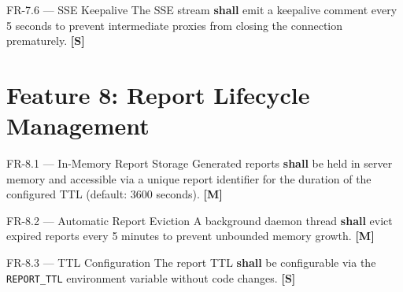 \begin{reqbox}{FR-7.6 — SSE Keepalive}
  The SSE stream \textbf{shall} emit a keepalive comment every 5 seconds to
  prevent intermediate proxies from closing the connection prematurely.
  \hfill \textbf{[S]}
\end{reqbox}

\section{Feature 8: Report Lifecycle Management}
\label{sec:fr_lifecycle}

\begin{reqbox}{FR-8.1 — In-Memory Report Storage}
  Generated reports \textbf{shall} be held in server memory and accessible via a
  unique report identifier for the duration of the configured TTL (default:
  3600 seconds). \hfill \textbf{[M]}
\end{reqbox}

\begin{reqbox}{FR-8.2 — Automatic Report Eviction}
  A background daemon thread \textbf{shall} evict expired reports every 5 minutes
  to prevent unbounded memory growth. \hfill \textbf{[M]}
\end{reqbox}

\begin{reqbox}{FR-8.3 — TTL Configuration}
  The report TTL \textbf{shall} be configurable via the \texttt{REPORT\_TTL}
  environment variable without code changes. \hfill \textbf{[S]}
\end{reqbox}

